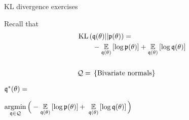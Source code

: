 
\begin{frame}{KL divergence exercises}
\begin{minipage}{0.5\textwidth}
%
Recall that
\begin{align*}
%
\MoveEqLeft
\kl{\q(\theta)}{\p(\theta)} ={}\\&
-\expect{\q(\theta)}{\log \p(\theta)} +
\expect{\q(\theta)}{\log \q(\theta)}\\
\\
\qdom ={}& \left\{ \textrm{Bivariate normals}\right\}
%
\end{align*}

\hspace{-2em}$\mathfrak{q}^*(\theta) = $

$\underset{\mathfrak{q} \in \mathcal{Q}}{\mathrm{argmin}}\,
\Big(-\underset{\mathfrak{q}(\theta)}{\mathbb{E}}\left[\log \mathfrak{p}(\theta)\right] +$
\sout{$\underset{\mathfrak{q}(\theta)}{\mathbb{E}}\left[\log \mathfrak{q}(\theta)\right] \Big)$}
%
\end{minipage}
%
\begin{minipage}{0.4\textwidth}

\end{minipage}

\end{frame}




